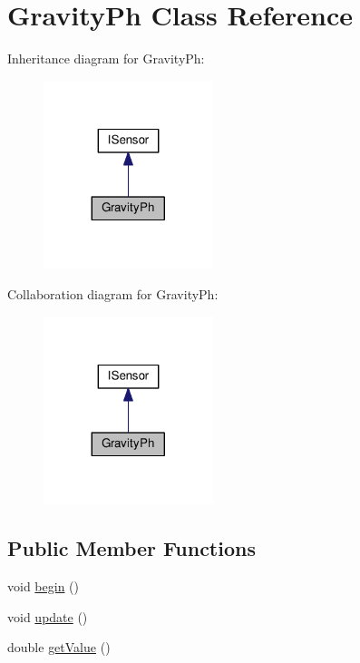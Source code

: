\hypertarget{class_gravity_ph}{}\section{Gravity\+Ph Class Reference}
\label{class_gravity_ph}


Inheritance diagram for Gravity\+Ph\+:\nopagebreak
\begin{figure}[H]
\begin{center}
\leavevmode
\includegraphics[width=140pt]{class_gravity_ph__inherit__graph}
\end{center}
\end{figure}


Collaboration diagram for Gravity\+Ph\+:\nopagebreak
\begin{figure}[H]
\begin{center}
\leavevmode
\includegraphics[width=140pt]{class_gravity_ph__coll__graph}
\end{center}
\end{figure}
\subsection*{Public Member Functions}
\begin{DoxyCompactItemize}
\item 
void \hyperlink{class_gravity_ph_a15c06b3c63d098a3b413e5cc97beb547}{begin} ()
\item 
void \hyperlink{class_gravity_ph_a3661f2d7ae52fcdcc7cde674e9a1e213}{update} ()
\item 
double \hyperlink{class_gravity_ph_a12f9ad86776c01409e0e3d4e3ab46178}{get\+Value} ()
\end{DoxyCompactItemize}
